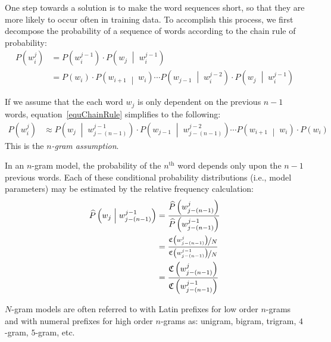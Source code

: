 \documentclass[10pt]{article}
\newcommand{\superscript}[1]{\ensuremath{^{\textrm{#1}}} }
\newcommand{\xth}[0]{\superscript{th}}
\newcommand{\ngram}{$n$-gram\xspace}
\newcommand{\ngrams}{$n$-grams\xspace}
\newcommand{\Ngram}{$N$-gram\xspace}
\newcommand{\cnt}[1]{\mathfrak{C}\left(#1\right)}
\newcommand{\prb}[1]{P\left(#1\right)}
\newcommand{\cprb}[2]{P\left(#1 \;\middle\vert\; #2 \right)}
\newcommand{\hprb}[1]{\widehat{P}\left(#1\right)}
\newcommand{\hcprb}[2]{\widehat{P}\left(#1  \;\middle\vert\; #2 \right)}
\begin{document}
One step towards a solution is to make the word sequences short, so that they are more likely to occur often in training data.
To accomplish this process, we first decompose the probability of a sequence of words according to the chain rule of probability:
\begin{align}
\prb{w_i^j} &= \prb{w_i^{j-1}} \cdot \cprb{w_j}{w_i^{j-1}}   \nonumber \\
&= \prb{w_i} \cdot \cprb{w_{i+1}}{w_i} \cdots \cprb{w_{j-1}}{w_i^{j-2}} \cdot \cprb{w_j}{w_i^{j-1}} \label{equChainRule} 
\end{align}

If we assume that the each word $w_j$ is only dependent on the previous $n-1$ words, equation~\ref{equChainRule} simplifies to the following:
\begin{align}
\prb{w_i^j} &\approx \cprb{w_j}{w_{j-(n-1)}^{j-1}} \cdot \cprb{w_{j-1}}{w_{j-(n-1)}^{j-2}} \cdots \cprb{w_{i+1}}{w_i} \cdot \prb{w_i} \label{equNGram}
\end{align}
This is the \emph{\ngram assumption}.

In an \ngram model, the probability of the $n\xth$ word depends only upon the $n-1$ previous words.
Each of these conditional probability distributions (i.e., model parameters) may be estimated by the relative frequency calculation:
\begin{align}
\hcprb{w_j}{w^{j-1}_{j-(n-1)}} &= \frac{\hprb{w^{j}_{j-(n-1)}}}{\hprb{w^{j-1}_{j-(n-1)}}} \\
&= \frac{\nicefrac{\cnt{w^{j}_{j-(n-1)}}}{N}}{\nicefrac{\cnt{w^{j-1}_{j-(n-1)}}}{N}} \\
&= \frac{\cnt{w^{j}_{j-(n-1)}}}{\cnt{w^{j-1}_{j-(n-1)}}} \label{equSeqFreq} %
\end{align}

\Ngram models are often referred to with Latin prefixes for low order \ngrams and with numeral prefixes for high order \ngrams as: unigram, bigram, trigram, $4$-gram, $5$-gram, etc.


\end{document}
